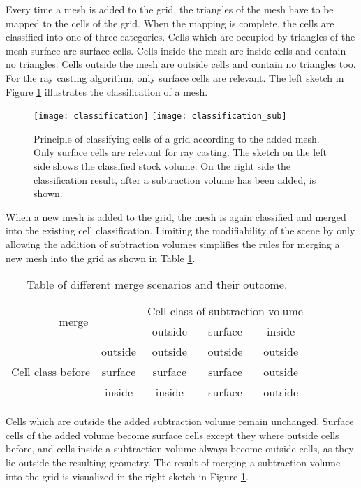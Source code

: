 Every time a mesh is added to the grid, the triangles of the mesh have to be mapped to the cells of the grid. When the mapping is complete, the cells are classified into one of three categories. Cells which are occupied by triangles of the mesh surface are surface cells. Cells inside the mesh are inside cells and contain no triangles. Cells outside the mesh are outside cells and contain no triangles too. For the ray casting algorithm, only surface cells are relevant. The left sketch in Figure \ref{fig:classification} illustrates the classification of a mesh.

\begin{figure}[h]
\centering
\texttt{[image: classification]}
\texttt{[image: classification\_sub]}
\caption[Principle of classifying cells of a grid according to the added mesh.]{Principle of classifying cells of a grid according to the added mesh. Only surface cells are relevant for ray casting. The sketch on the left side shows the classified stock volume. On the right side the classification result, after a subtraction volume has been added, is shown.}
\label{fig:classification}
\end{figure}

When a new mesh is added to the grid, the mesh is again classified and merged into the existing cell classification. Limiting the modifiability of the scene by only allowing the addition of subtraction volumes simplifies the rules for merging a new mesh into the grid as shown in Table \ref{tbl:classification_rules}.

\begin{table}[h]
\centering
\begin{tabular}{|c|c|c|c|c|}
\hline
\multicolumn{2}{|c|}{\multirow{2}{*}{merge}} & \multicolumn{3}{c|}{Cell class of subtraction volume} \\
\cline{3-5}
\multicolumn{2}{|c|}{} & outside & surface & inside \\
 \hline
\multirow{3}{*}{Cell class before} & outside & outside & outside & outside \\
\cline{2-5}
 & surface & surface & surface & outside \\
\cline{2-5}
 & inside & inside & surface & outside \\
\hline
\end{tabular}
\caption{Table of different merge scenarios and their outcome.}
\label{tbl:classification_rules}
\end{table}

Cells which are outside the added subtraction volume remain unchanged. Surface cells of the added volume become surface cells except they where outside cells before, and cells inside a subtraction volume always become outside cells, as they lie outside the resulting geometry. The result of merging a subtraction volume into the grid is visualized in the right sketch in Figure \ref{fig:classification}.

